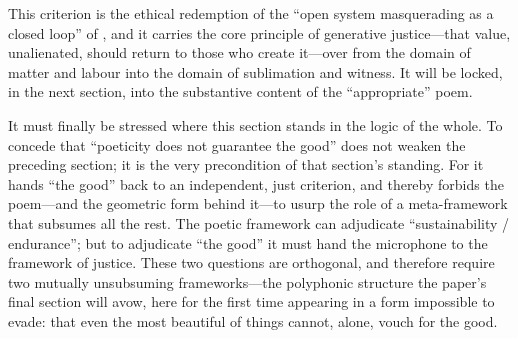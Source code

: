 This criterion is the ethical redemption of the ``open system masquerading as a closed loop'' of , and it carries the core principle of generative justice---that value, unalienated, should return to those who create it---over from the domain of matter and labour into the domain of sublimation and witness. It will be locked, in the next section, into the substantive content of the ``appropriate'' poem.

It must finally be stressed where this section stands in the logic of the whole. To concede that ``poeticity does not guarantee the good'' does not weaken the preceding section; it is the very precondition of that section's standing. For it hands ``the good'' back to an independent, just criterion, and thereby forbids the poem---and the geometric form behind it---to usurp the role of a meta-framework that subsumes all the rest. The poetic framework can adjudicate ``sustainability / endurance''; but to adjudicate ``the good'' it must hand the microphone to the framework of justice.  These two questions are orthogonal, and therefore require two mutually unsubsuming frameworks---the polyphonic structure the paper's final section will avow, here for the first time appearing in a form impossible to evade: that even the most beautiful of things cannot, alone, vouch for the good.
